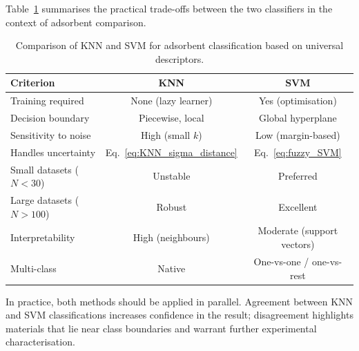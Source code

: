 	Table~\ref{tab:KNN_vs_SVM} summarises the practical
	trade-offs between the two classifiers in the context of
	adsorbent comparison.

	\begin{table}[H]
		\centering
		\small
		\caption{Comparison of KNN and SVM for adsorbent
			classification based on universal descriptors.}
		\label{tab:KNN_vs_SVM}
		\renewcommand{\arraystretch}{1.4}
		\begin{tabular}{lcc}
			\hline
			\textbf{Criterion}
			& \textbf{KNN}
			& \textbf{SVM}
			\\
			\hline
			Training required
			& None (lazy learner)
			& Yes (optimisation)
			\\
			Decision boundary
			& Piecewise, local
			& Global hyperplane
			\\
			Sensitivity to noise
			& High (small $k$)
			& Low (margin-based)
			\\
			Handles uncertainty
			& Eq.~\eqref{eq:KNN_sigma_distance}
			& Eq.~\eqref{eq:fuzzy_SVM}
			\\
			Small datasets ($N < 30$)
			& Unstable
			& Preferred
			\\
			Large datasets ($N > 100$)
			& Robust
			& Excellent
			\\
			Interpretability
			& High (neighbours)
			& Moderate (support vectors)
			\\
			Multi-class
			& Native
			& One-vs-one / one-vs-rest
			\\
			\hline
		\end{tabular}
	\end{table}

	In practice, both methods should be applied in parallel.
	Agreement between KNN and SVM classifications increases
	confidence in the result; disagreement highlights materials
	that lie near class boundaries and warrant further
	experimental characterisation.



